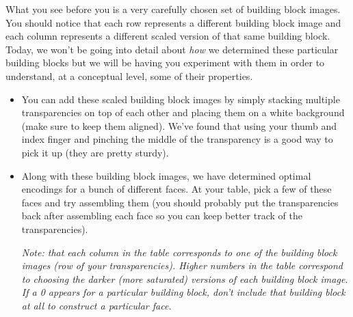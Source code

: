 What you see before you is a very carefully chosen set of building block images.  You should notice that each row represents a different building block image and each column represents a different scaled version of that same building block.  Today, we won't be going into detail about \emph{how} we determined these particular building blocks but we will be having you experiment with them in order to understand, at a conceptual level, some of their properties.

\begin{itemize}
\item You can add these scaled building block images by simply stacking multiple transparencies on top of each other and placing them on a white background (make sure to keep them aligned).  We've found that using your thumb and index finger and pinching the middle of the transparency is a good way to pick it up (they are pretty sturdy).
\item Along with these building block images, we have determined optimal encodings for a bunch of different faces.  At your table, pick a few of these faces and try assembling them (you should probably put the transparencies back after assembling each face so you can keep better track of the transparencies).

\emph{Note: that each column in the table corresponds to one of the building block images (row of your transparencies).  Higher numbers in the table correspond to choosing the darker (more saturated) versions of each building block image.  If a 0 appears for a particular building block, don't include that building block at all to construct a particular face.}


\end{itemize}
